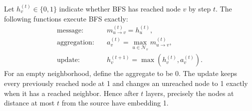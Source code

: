 \begin{solution}
Let $h_v^{(t)}\in\{0,1\}$ indicate whether BFS has reached node $v$ by step
$t$.  The following functions execute BFS exactly:
\begin{align*}
  \text{message:}\quad
    &m_{u\to v}^{(t)}=h_u^{(t)},\\
  \text{aggregation:}\quad
    &a_v^{(t)}=\max_{u\in\mathcal N_v}m_{u\to v}^{(t)},\\
  \text{update:}\quad
    &h_v^{(t+1)}=\max\!\left(h_v^{(t)},a_v^{(t)}\right).
\end{align*}
For an empty neighborhood, define the aggregate to be 0.  The update keeps
every previously reached node at 1 and changes an unreached node to 1 exactly
when it has a reached neighbor.  Hence after $t$ layers, precisely the nodes at
distance at most $t$ from the source have embedding 1.
\end{solution}
